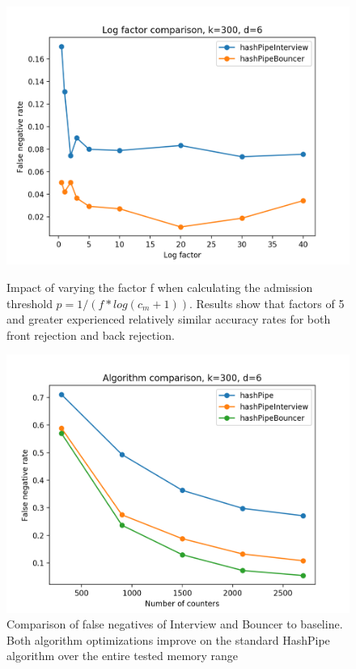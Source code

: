 \begin{figure}[!htb]
  \centering
	\includegraphics[scale=0.5]{log}
     \caption{Impact of varying the factor f when calculating the admission threshold $p = 1 / (f*log(c_m + 1))$. Results show that factors of 5 and greater experienced relatively similar accuracy rates for both front rejection and back rejection.}
     \label{fig:log}
    \includegraphics[scale=0.5]{falsenegatives}
     \caption{Comparison of false negatives of Interview and Bouncer to baseline. Both algorithm optimizations improve on the standard HashPipe algorithm over the entire tested memory range}
     \label{fig:falsenegatives}
\end{figure}

